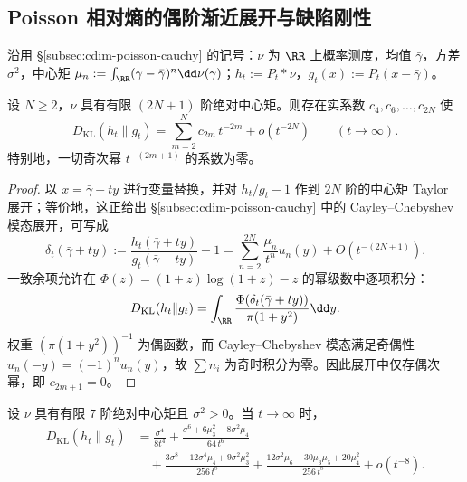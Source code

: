 
\subsection{Poisson 相对熵的偶阶渐近展开与缺陷刚性}\label{subsec:cdim-poisson-kl-defect-rigidity}

沿用 \S\ref{subsec:cdim-poisson-cauchy} 的记号：\(\nu\) 为 \(\RR\) 上概率测度，均值 \(\bar\gamma\)，方差 \(\sigma^2\)，中心矩 \(\mu_n:=\int_{\RR}(\gamma-\bar\gamma)^n\dd\nu(\gamma)\)；\(h_t:=P_t*\nu\)，\(g_t(x):=P_t(x-\bar\gamma)\)。

\begin{theorem}\label{thm:poisson-kl-even-orders}
设 \(N\ge 2\)，\(\nu\) 具有有限 \((2N{+}1)\) 阶绝对中心矩。则存在实系数 \(c_4,c_6,\dots,c_{2N}\) 使
\[
D_{\mathrm{KL}}(h_t\|g_t)
=\sum_{m=2}^{N}c_{2m}\,t^{-2m}+o(t^{-2N})
\qquad(t\to\infty).
\]
特别地，一切奇次幂 \(t^{-(2m+1)}\) 的系数为零。
\end{theorem}

\begin{proof}
以 \(x=\bar\gamma+ty\) 进行变量替换，并对 \(h_t/g_t-1\) 作到 \(2N\) 阶的中心矩 Taylor 展开；等价地，这正给出 \S\ref{subsec:cdim-poisson-cauchy} 中的 Cayley--Chebyshev 模态展开，可写成
\[
\delta_t(\bar\gamma+ty)
:=\frac{h_t(\bar\gamma+ty)}{g_t(\bar\gamma+ty)}-1
=\sum_{n=2}^{2N}\frac{\mu_n}{t^n}u_n(y)+O(t^{-(2N+1)}).
\]
一致余项允许在 \(\Phi(z)=(1+z)\log(1+z)-z\) 的幂级数中逐项积分：
\[
D_{\mathrm{KL}}(h_t\|g_t)
=\int_{\RR}\frac{\Phi(\delta_t(\bar\gamma+ty))}{\pi(1+y^2)}\dd y.
\]
权重 \((\pi(1+y^2))^{-1}\) 为偶函数，而 Cayley--Chebyshev 模态满足奇偶性 \(u_n(-y)=(-1)^n u_n(y)\)，故 \(\sum n_i\) 为奇时积分为零。因此展开中仅存偶次幂，即 \(c_{2m+1}=0\)。
\end{proof}

\begin{theorem}\label{thm:poisson-kl-eighth}
设 \(\nu\) 具有有限 \(7\) 阶绝对中心矩且 \(\sigma^2>0\)。当 \(t\to\infty\) 时，
\begin{equation}\label{eq:poisson-kl-eighth}
\begin{split}
D_{\mathrm{KL}}(h_t\|g_t)
&=\frac{\sigma^4}{8t^4}
+\frac{\sigma^6+6\mu_3^2-8\sigma^2\mu_4}{64\,t^6}
\\
&\quad
+\frac{3\sigma^8-12\sigma^4\mu_4+9\sigma^2\mu_3^2}{256\,t^8}
+\frac{12\sigma^2\mu_6-30\mu_3\mu_5+20\mu_4^2}{256\,t^8}
+o(t^{-8}).
\end{split}
\end{equation}
\end{theorem}

